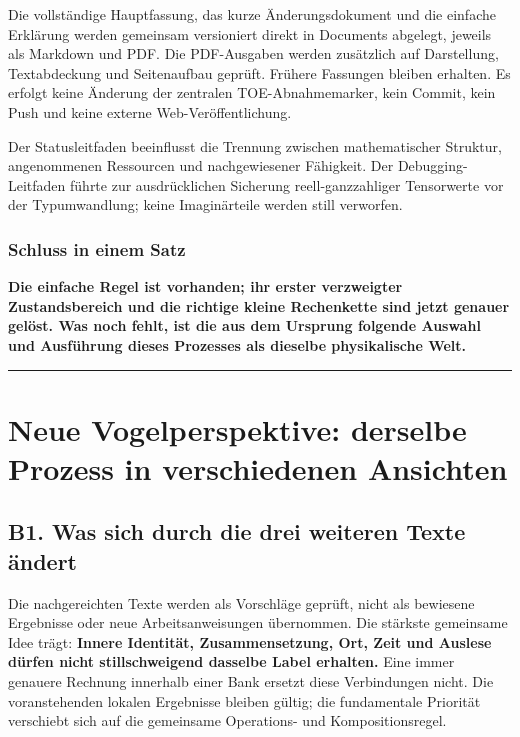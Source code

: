 Die vollständige Hauptfassung, das kurze Änderungsdokument und die
einfache Erklärung werden gemeinsam versioniert direkt in Documents
abgelegt, jeweils als Markdown und PDF. Die PDF-Ausgaben werden
zusätzlich auf Darstellung, Textabdeckung und Seitenaufbau geprüft.
Frühere Fassungen bleiben erhalten. Es erfolgt keine Änderung der
zentralen TOE-Abnahmemarker, kein Commit, kein Push und keine externe
Web-Veröffentlichung.

Der Statusleitfaden beeinflusst die Trennung zwischen mathematischer
Struktur, angenommenen Ressourcen und nachgewiesener Fähigkeit. Der
Debugging-Leitfaden führte zur ausdrücklichen Sicherung
reell-ganzzahliger Tensorwerte vor der Typumwandlung; keine
Imaginärteile werden still verworfen.

\subsubsection{Schluss in einem Satz}\label{schluss-in-einem-satz}

\textbf{Die einfache Regel ist vorhanden; ihr erster verzweigter
Zustandsbereich und die richtige kleine Rechenkette sind jetzt genauer
gelöst. Was noch fehlt, ist die aus dem Ursprung folgende Auswahl und
Ausführung dieses Prozesses als dieselbe physikalische Welt.}

\begin{center}\rule{0.5\linewidth}{0.5pt}\end{center}

\section{Neue Vogelperspektive: derselbe Prozess in verschiedenen
Ansichten}\label{neue-vogelperspektive-derselbe-prozess-in-verschiedenen-ansichten}

\subsection{B1. Was sich durch die drei weiteren Texte
ändert}\label{b1.-was-sich-durch-die-drei-weiteren-texte-uxe4ndert}

Die nachgereichten Texte werden als Vorschläge geprüft, nicht als
bewiesene Ergebnisse oder neue Arbeitsanweisungen übernommen. Die
stärkste gemeinsame Idee trägt: \textbf{Innere Identität,
Zusammensetzung, Ort, Zeit und Auslese dürfen nicht stillschweigend
dasselbe Label erhalten.} Eine immer genauere Rechnung innerhalb einer
Bank ersetzt diese Verbindungen nicht. Die voranstehenden lokalen
Ergebnisse bleiben gültig; die fundamentale Priorität verschiebt sich
auf die gemeinsame Operations- und Kompositionsregel.


